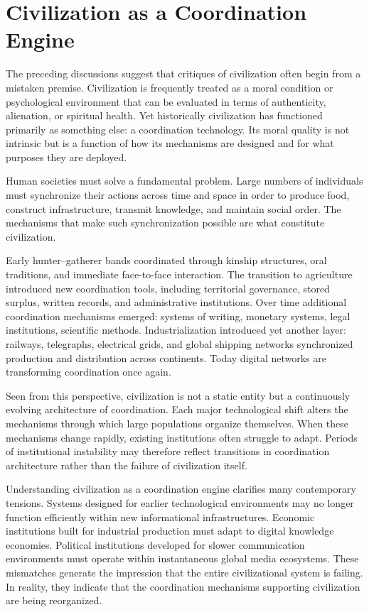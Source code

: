\documentclass[12pt]{article}
\begin{document}
\section{Civilization as a Coordination Engine}

The preceding discussions suggest that critiques of civilization often begin from a mistaken premise. Civilization is frequently treated as a moral condition or psychological environment that can be evaluated in terms of authenticity, alienation, or spiritual health. Yet historically civilization has functioned primarily as something else: a coordination technology. Its moral quality is not intrinsic but is a function of how its mechanisms are designed and for what purposes they are deployed.

Human societies must solve a fundamental problem. Large numbers of individuals must synchronize their actions across time and space in order to produce food, construct infrastructure, transmit knowledge, and maintain social order. The mechanisms that make such synchronization possible are what constitute civilization.

Early hunter--gatherer bands coordinated through kinship structures, oral traditions, and immediate face-to-face interaction. The transition to agriculture introduced new coordination tools, including territorial governance, stored surplus, written records, and administrative institutions. Over time additional coordination mechanisms emerged: systems of writing, monetary systems, legal institutions, scientific methods. Industrialization introduced yet another layer: railways, telegraphs, electrical grids, and global shipping networks synchronized production and distribution across continents. Today digital networks are transforming coordination once again.

Seen from this perspective, civilization is not a static entity but a continuously evolving architecture of coordination. Each major technological shift alters the mechanisms through which large populations organize themselves. When these mechanisms change rapidly, existing institutions often struggle to adapt. Periods of institutional instability may therefore reflect transitions in coordination architecture rather than the failure of civilization itself.

Understanding civilization as a coordination engine clarifies many contemporary tensions. Systems designed for earlier technological environments may no longer function efficiently within new informational infrastructures. Economic institutions built for industrial production must adapt to digital knowledge economies. Political institutions developed for slower communication environments must operate within instantaneous global media ecosystems. These mismatches generate the impression that the entire civilizational system is failing. In reality, they indicate that the coordination mechanisms supporting civilization are being reorganized.
\end{document}
